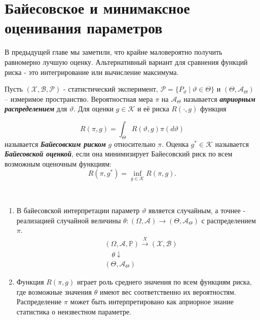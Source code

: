 \graphicspath{{./chapters/chapter03/}}
\chapter{Байесовское и минимаксное оценивания параметров}

В предыдущей главе мы заметили, что крайне маловероятно получить равномерно лучшую оценку. Альтернативный вариант для сравнения функций риска - это интегрирование или вычисление максимума.

\begin{defn}
	Пусть $(\mathcal{X}, \mathcal{B}, \mathcal{P})$ - статистический эксперимент, $\mathcal{P}=\{P_{\vartheta} \mid \vartheta \in \Theta\}$ и $(\Theta, \mathcal{A}_{\Theta})$ -- измеримое пространство. Вероятностная мера $\pi$ на $\mathcal{A}_{\Theta}$ называется \textbf{\textit{априорным распределением}} для $\vartheta$. Для оценки $g \in \mathcal{K}$ и её риска $R(\cdot, g)$ функция
	
	\[ R(\pi, g)=\int_{\Theta} R(\vartheta, g) \pi(d\vartheta) \]
	называется \textbf{\textit{Байесовским риском}} $g$ относительно $\pi$. Оценка $g^* \in \mathcal{K}$ называется \textbf{\textit{Байесовской оценкой}}, если она минимизирует Байесовский риск по всем возможным оценочным функциям:
	\[R(\pi, g^*)=\inf_{g \in \mathcal{K}}R(\pi, g).\]
\end{defn}

\begin{rmrk} \
	\begin{enumerate}
		\item В байесовской интерпретации параметр $\vartheta$ является случайным, а точнее - реализацией случайной величины $\theta:(\Omega, \mathcal{A}) \rightarrow (\Theta,\mathcal{A}_{\Theta})$ с распределением $\pi$.
		\begin{align*}
		& (\Omega, \mathcal{A}, \mathbb{P}) \xrightarrow{X} (\mathcal{X}, \mathcal{B}) \\
		& \quad \theta \downarrow \\
		& (\Theta,\mathcal{A}_{\Theta})
		\end{align*}
		\item Функция $R(\pi, g)$ играет роль среднего значения по всем функциям риска, где возможные значения $\theta$ имеют вес соответственно их вероятностям. Распределение $\pi$ может быть интерпретировано как априорное знание статистика о неизвестном параметре.
	\end{enumerate}
\end{rmrk}

